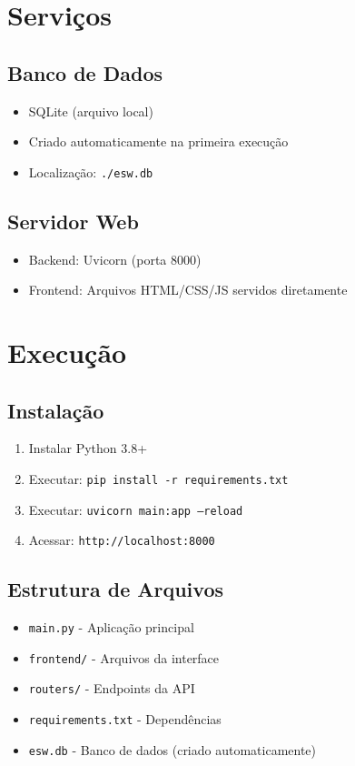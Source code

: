 \documentclass[12pt,a4paper]{article}
\begin{document}
\section{Serviços}

\subsection{Banco de Dados}
\begin{itemize}
    \item SQLite (arquivo local)
    \item Criado automaticamente na primeira execução
    \item Localização: \texttt{./esw.db}
\end{itemize}

\subsection{Servidor Web}
\begin{itemize}
    \item Backend: Uvicorn (porta 8000)
    \item Frontend: Arquivos HTML/CSS/JS servidos diretamente
\end{itemize}

\section{Execução}

\subsection{Instalação}
\begin{enumerate}
    \item Instalar Python 3.8+
    \item Executar: \texttt{pip install -r requirements.txt}
    \item Executar: \texttt{uvicorn main:app --reload}
    \item Acessar: \texttt{http://localhost:8000}
\end{enumerate}

\subsection{Estrutura de Arquivos}
\begin{itemize}
    \item \texttt{main.py} - Aplicação principal
    \item \texttt{frontend/} - Arquivos da interface
    \item \texttt{routers/} - Endpoints da API
    \item \texttt{requirements.txt} - Dependências
    \item \texttt{esw.db} - Banco de dados (criado automaticamente)
\end{itemize}
\end{document}
